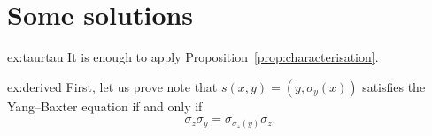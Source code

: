 \section*{Some solutions}

\fancyhf{}
\fancyfoot[R]{\thepage}
\fancyhead[L]{\course}
\setlength{\headheight}{14pt}

\begin{sol}{ex:taurtau}
    It is enough to apply Proposition~\ref{prop:characterisation}.
\end{sol}


\begin{sol}{ex:derived}
    First, let us prove note that $s(x,y) =(y,\sigma_y(x))$ satisfies the Yang--Baxter equation if and only if 
    \begin{align*}
        \sigma_z\sigma_y=\sigma_{\sigma_z(y)}\sigma_z.
    \end{align*}


\end{sol}
